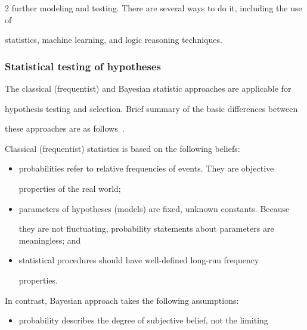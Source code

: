 \begin{multicols}{2}
further modeling and testing. There are several ways to do it, including the use of


statistics, machine learning, and logic reasoning techniques.





\subsubsection{Statistical testing of hypotheses }





  \noindent


  The classical (frequentist) and Bayesian statistic approaches are applicable for


hypothesis testing and selection. Brief summary of the basic differences between


these approaches are as follows~\cite{27-kl}.





  Classical (frequentist) statistics is based on the following beliefs:


  \begin{itemize}


\item probabilities refer to relative frequencies of events. They are objective


properties of the real world;


\item parameters of hypotheses (models) are fixed, unknown constants. Because


they are not fluctuating, probability statements about parameters are meaningless; and


\item statistical procedures should have well-defined long-run frequency


properties.


\end{itemize}





  In contrast, Bayesian approach takes the following assumptions:


  \begin{itemize}


\item probability describes the degree of subjective belief, not the limiting



\end{itemize}
\end{multicols}
